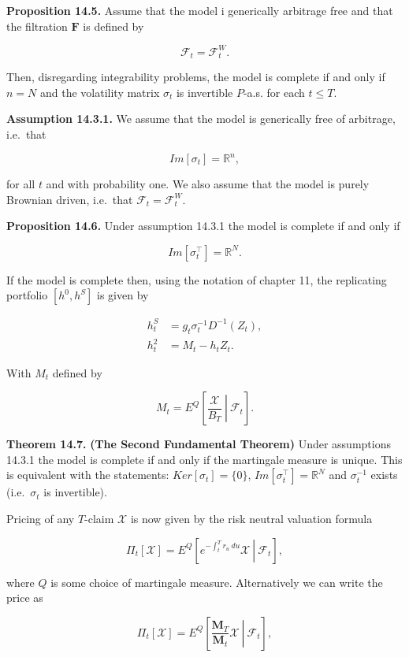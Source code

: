 \documentclass[
]{article}
\begin{document}
\textbf{Proposition 14.5.} Assume that the model i generically arbitrage
free and that the filtration \(\mathbf{F}\) is defined by

\[
\mathcal{F}_t=\mathcal{F}^W_t.
\]

Then, disregarding integrability problems, the model is complete if and
only if \(n=N\) and the volatility matrix \(\sigma_t\) is invertible
\(P\)-a.s. for each \(t\le T\).

\textbf{Assumption 14.3.1.} We assume that the model is generically free
of arbitrage, i.e.~that

\[
Im[\sigma_t]=\mathbb{R}^n,
\]

for all \(t\) and with probability one. We also assume that the model is
purely Brownian driven, i.e.~that \(\mathcal{F}_t=\mathcal{F}_t^W\).

\textbf{Proposition 14.6.} Under assumption 14.3.1 the model is complete
if and only if

\[
Im[\sigma_t^\top]=\mathbb{R}^N.
\]

If the model is complete then, using the notation of chapter 11, the
replicating portfolio \([h^0,h^S]\) is given by

\begin{align*}
h_t^S&=g_t\sigma_t^{-1}D^{-1}(Z_t),\\
h_t^2&=M_t-h_tZ_t.
\end{align*}

With \(M_t\) defined by

\[
M_t=E^Q\left[\left. \frac{\mathcal{X}}{B_T}\ \right\vert\ \mathcal{F}_t \right].
\]

\textbf{Theorem 14.7.} \textbf{(The Second Fundamental Theorem)} Under
assumptions 14.3.1 the model is complete if and only if the martingale
measure is unique. This is equivalent with the statements:
\(Ker[\sigma_t]=\{0\}\), \(Im[\sigma_t^\top]=\mathbb{R}^N\) and
\(\sigma_t^{-1}\) exists (i.e.~\(\sigma_t\) is invertible).

Pricing of any \(T\)-claim \(\mathcal{X}\) is now given by the risk
neutral valuation formula

\[
\Pi_t[\mathcal{X}] = E^Q\left[\left. e^{-\int_t^Tr_u\ du}\mathcal{X} \ \right\vert\ \mathcal{F}_t\right],
\]

where \(Q\) is some choice of martingale measure. Alternatively we can
write the price as

\[
\Pi_t[\mathcal{X}] = E^Q\left[\left. \frac{\mathbf{M}_T}{\mathbf{M}_t}\mathcal{X} \ \right\vert\ \mathcal{F}_t\right],
\]
\end{document}
